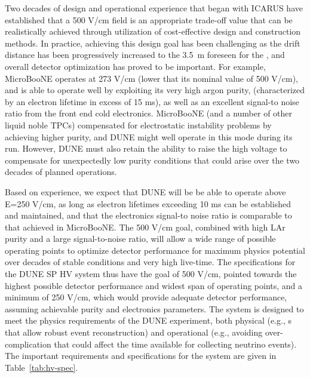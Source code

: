 Two decades of design and operational experience that began with ICARUS have established that a 500 V/cm field is an appropriate trade-off value that can be realistically achieved through utilization of cost-effective design and construction methods. In practice, achieving this design goal has been challenging as the drift distance has been progressively increased to the 
\SI{3.5}{m} foreseen for the , and overall detector optimization has proved to be important. For example, MicroBooNE operates  at 273 V/cm (lower that its nominal value of 500 V/cm), and is able to operate well by exploiting its very high argon purity, (characterized by an electron lifetime in excess of 15 ms), as well as an excellent signal-to noise ratio from the front end cold electronics.  %
MicroBooNE (and a number of other liquid noble TPCs) compensated for electrostatic instability problems by achieving higher purity, and DUNE might well operate in this mode during its run.  However, DUNE must also retain the ability to raise the high voltage to compensate for unexpectedly low purity conditions that could arise over the two decades of planned operations.

Based on experience, we expect that DUNE will be be able to operate  above E=250 V/cm, 
as long as electron lifetimes exceeding 10 ms can be established and maintained, %
and that the electronics signal-to noise ratio is comparable to that achieved in MicroBooNE. 
The 500 V/cm \efield goal, combined with high LAr purity and a large signal-to-noise ratio, will allow  a wide range of possible operating points to optimize detector performance for maximum physics potential over decades of stable conditions and very high live-time. 
The specifications for the DUNE SP HV system thus have the goal of 500 V/cm, pointed  towards the highest possible detector performance and widest span of operating points, and a minimum of 250 V/cm, which would provide adequate detector performance, assuming achievable purity and electronics parameters.
The  system is designed to meet the physics requirements of the DUNE experiment,  both physical  (e.g., \efield{}s that allow robust event reconstruction) and operational (e.g., avoiding over-complication that could affect %
the time available for collecting neutrino events). %
The important requirements and specifications for the  system are given in Table~\ref{tab:hv-spec}.  

